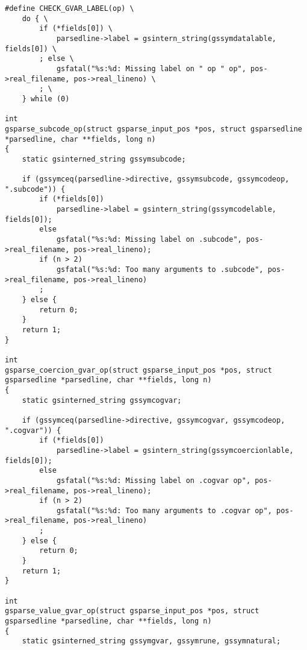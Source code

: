 \documentclass{report}
\begin{document}
\begin{verbatim}
#define CHECK_GVAR_LABEL(op) \
    do { \
        if (*fields[0]) \
            parsedline->label = gsintern_string(gssymdatalable, fields[0]) \
        ; else \
            gsfatal("%s:%d: Missing label on " op " op", pos->real_filename, pos->real_lineno) \
        ; \
    } while (0)

int
gsparse_subcode_op(struct gsparse_input_pos *pos, struct gsparsedline *parsedline, char **fields, long n)
{
    static gsinterned_string gssymsubcode;

    if (gssymceq(parsedline->directive, gssymsubcode, gssymcodeop, ".subcode")) {
        if (*fields[0])
            parsedline->label = gsintern_string(gssymcodelable, fields[0]);
        else
            gsfatal("%s:%d: Missing label on .subcode", pos->real_filename, pos->real_lineno);
        if (n > 2)
            gsfatal("%s:%d: Too many arguments to .subcode", pos->real_filename, pos->real_lineno)
        ;
    } else {
        return 0;
    }
    return 1;
}

int
gsparse_coercion_gvar_op(struct gsparse_input_pos *pos, struct gsparsedline *parsedline, char **fields, long n)
{
    static gsinterned_string gssymcogvar;

    if (gssymceq(parsedline->directive, gssymcogvar, gssymcodeop, ".cogvar")) {
        if (*fields[0])
            parsedline->label = gsintern_string(gssymcoercionlable, fields[0]);
        else
            gsfatal("%s:%d: Missing label on .cogvar op", pos->real_filename, pos->real_lineno);
        if (n > 2)
            gsfatal("%s:%d: Too many arguments to .cogvar op", pos->real_filename, pos->real_lineno)
        ;
    } else {
        return 0;
    }
    return 1;
}

int
gsparse_value_gvar_op(struct gsparse_input_pos *pos, struct gsparsedline *parsedline, char **fields, long n)
{
    static gsinterned_string gssymgvar, gssymrune, gssymnatural;


\end{verbatim}
\end{document}
